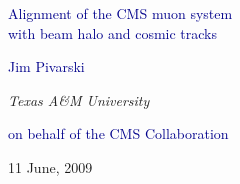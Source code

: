 \documentclass[compress]{beamer}
\begin{document}
\begin{frame}
\vfill
\begin{center}
\textcolor{darkblue}{\Large Alignment of the CMS muon system \\ \vspace{0.15 cm}with beam halo and cosmic tracks}

\vfill
\begin{center}
\large
\textcolor{darkblue}{Jim Pivarski}

\scriptsize
\vspace{0.25 cm}
{\it Texas A\&M University}

\vspace{0.75 cm}
\small
\textcolor{darkblue}{on behalf of the CMS Collaboration}
\end{center}

\vfill
11 June, 2009

\end{center}
\end{frame}


\small
\end{document}
